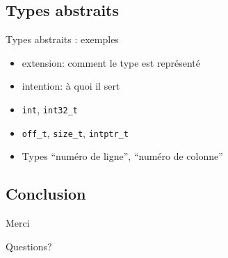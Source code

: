 \documentclass{beamer}
\begin{document}

\subsection{Types abstraits}

\begin{frame}{Types abstraits : exemples}
    \begin{itemize}
        \item extension: comment le type est représenté
        \item intention: à quoi il sert
        \item \texttt{int}, \texttt{int32\_t}
        \item \texttt{off\_t}, \texttt{size\_t}, \texttt{intptr\_t}
        \item Types \enquote{numéro de ligne}, \enquote{numéro de colonne}
    \end{itemize}
\end{frame}

\subsection{Conclusion}


\begin{frame}
    Merci

    Questions?
\end{frame}
\end{document}
